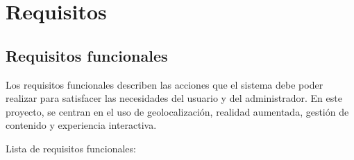 

\section{Requisitos}
\subsection{Requisitos funcionales}
Los requisitos funcionales describen las acciones que el sistema debe poder realizar para satisfacer las necesidades del usuario y del administrador. En este proyecto, se centran en el uso de geolocalización, realidad aumentada, gestión de contenido y experiencia interactiva.

Lista de requisitos funcionales:

